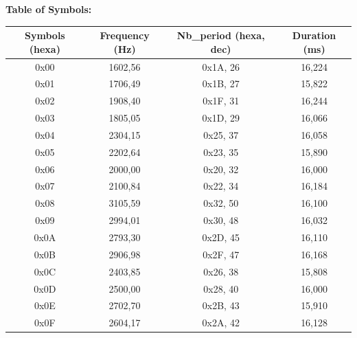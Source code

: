 \documentclass[a4paper,french,12pt]{report}
\begin{document}
\newpage
\noindent \textbf{Table of Symbols:}
\begin{center}
\begin{tabular}{c c c c}
Symbols (hexa)	&	Frequency (Hz)	&	Nb\_period (hexa, dec)	&	Duration (ms) \\ \hline
	0x00		&		1602,56		&		0x1A, 26			&	16,224	\\	
	0x01		&		1706,49		&		0x1B, 27			&	15,822	\\		
	0x02		&		1908,40		&		0x1F, 31			&	16,244	\\		
	0x03		&		1805,05		&		0x1D, 29			&	16,066	\\		
	0x04		&		2304,15		&		0x25, 37			&	16,058	\\		
	0x05		&		2202,64		&		0x23, 35			&	15,890	\\		
	0x06		&		2000,00		&		0x20, 32			&	16,000	\\		
	0x07		&		2100,84		&		0x22, 34			&	16,184	\\		
	0x08		&		3105,59		&		0x32, 50			&	16,100	\\		
	0x09		&		2994,01		&		0x30, 48			&	16,032	\\		
	0x0A		&		2793,30		&		0x2D, 45			&	16,110	\\		
	0x0B		&		2906,98		&		0x2F, 47			&	16,168	\\		
	0x0C		&		2403,85		&		0x26, 38			&	15,808	\\
	0x0D		&		2500,00		&		0x28, 40			&	16,000	\\		
	0x0E		&		2702,70		&		0x2B, 43			&	15,910  \\
	0x0F		&		2604,17		&		0x2A, 42			&       16,128  \\ 		
\end{tabular}
\end{center}		
	
\end{document}
